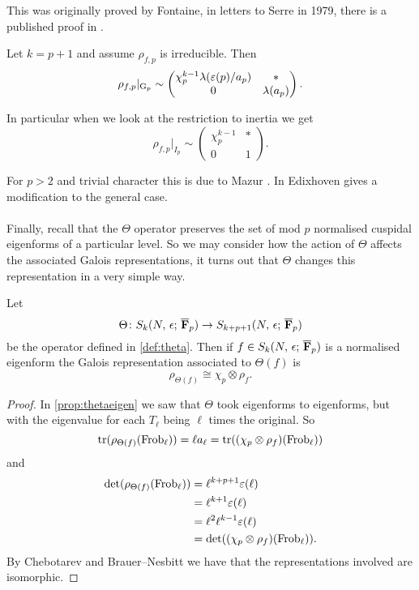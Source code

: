 \documentclass[a4paper,12pt]{article}
\begin{document}
This was originally proved by Fontaine, in letters to Serre in 1979, there is a published proof in \cite[sec. 6]{EdixhovenWeight}.

\begin{thm}[Mazur]\label{thm:mazur}
Let $k = p + 1$ and assume $\rho_{f,p}$ is irreducible.
Then
\[
\rho_{f,p}|_{\mathrm{G}_p} \sim \begin{pmatrix} \chi_p^{k-1}\lambda(\varepsilon(p)/a_p) & * \\ 0 & \lambda(a_p)\end{pmatrix}.
\]

In particular when we look at the restriction to inertia we get
\[
\rho_{f,p}|_{I_{p}} \sim \begin{pmatrix} \chi_p^{k-1} & * \\ 0 & 1\end{pmatrix}.
\]
\end{thm}

For $p> 2$ and trivial character this is due to Mazur \cite[sec. 6]{Ribet}.
In \cite[sec. 2]{EdixhovenWeight} Edixhoven gives a modification to the general case.

\paragraph{}
Finally, recall that the $\Theta$ operator preserves the set of mod $p$ normalised cuspidal eigenforms of a particular level.
So we may consider how the action of $\Theta$ affects the associated Galois representations, it turns out that $\Theta$ changes this representation in a very simple way.

\begin{prop}\label{prop:theta}
Let
\[
\Theta\colon S_k(N,\,\epsilon;\,\overline{\mathbf{F}}_p)\to S_{k+p+1}(N,\,\epsilon;\,\overline{\mathbf{F}}_p)
\]
be the operator defined in \cref{def:theta}.
Then if $f \in S_k(N,\,\epsilon;\,\overline{\mathbf{F}}_p)$ is a normalised eigenform the Galois representation associated to $\Theta(f)$ is
\[
\rho_{\Theta(f)} \cong \chi_p\otimes\rho_{f}.
\]
\end{prop}
\begin{proof}
In \cref{prop:thetaeigen} we saw that $\Theta$ took eigenforms to eigenforms, but with the eigenvalue for each $T_{\ell}$ being $\ell$ times the original.
So
\[
\operatorname{tr}(\rho_{\Theta(f)}(\operatorname{Frob}_\ell)) = \ell a_{\ell} = \operatorname{tr}((\chi_p \otimes \rho_{f})(\operatorname{Frob}_{\ell}))
\]
and
\begin{align*}
\det(\rho_{\Theta(f)}(\operatorname{Frob}_\ell)) &= \ell^{k+p+1}\varepsilon(\ell)\\
                                   &= \ell^{k+1}\varepsilon(\ell)\\
                                   &= \ell^2\ell^{k-1}\varepsilon(\ell)\\
                                   &= \det((\chi_p \otimes \rho_{f})(\operatorname{Frob}_{\ell})).
\end{align*}
By Chebotarev and Brauer--Nesbitt we have that the representations involved are isomorphic.
\end{proof}
\end{document}
